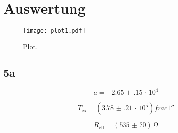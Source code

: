 \section{Auswertung}
\label{sec:Auswertung}

\begin{figure}
  \centering
  \texttt{[image: plot1.pdf]}
  \caption{Plot.}
  \label{fig:plot}
\end{figure}


\subsection{5a}
\begin{equation}
   a = \num{-2.65(15)}\, \cdot\, 10^{4}
\end{equation}

\begin{equation}
   T_{\text{ex}} = (\num{3.78(21)} \, \cdot\, 10^{5} )\si{frac{1}{\second}}
\end{equation}

\begin{equation}
R_{\text{eff}} = (\num{535(30)}) \, \si{\ohm}
\end{equation}
